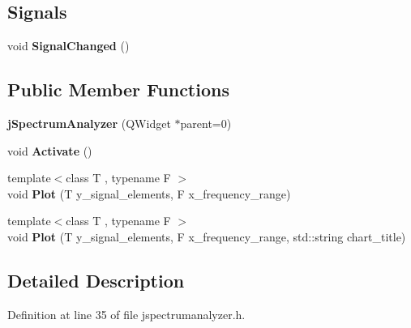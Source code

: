 \subsection*{Signals}
\begin{DoxyCompactItemize}
\item 
void {\bfseries Signal\+Changed} ()\hypertarget{classjaspl_1_1j_spectrum_analyzer_a9c5cf1221b35e6392fff8bf418edcedd}{}\label{classjaspl_1_1j_spectrum_analyzer_a9c5cf1221b35e6392fff8bf418edcedd}

\end{DoxyCompactItemize}
\subsection*{Public Member Functions}
\begin{DoxyCompactItemize}
\item 
{\bfseries j\+Spectrum\+Analyzer} (Q\+Widget $\ast$parent=0)\hypertarget{classjaspl_1_1j_spectrum_analyzer_a5101faac87201a91ea02e2afcbdf33db}{}\label{classjaspl_1_1j_spectrum_analyzer_a5101faac87201a91ea02e2afcbdf33db}

\item 
void {\bfseries Activate} ()\hypertarget{classjaspl_1_1j_spectrum_analyzer_a778e2eef7d689c8b9f4df3d0894af4a2}{}\label{classjaspl_1_1j_spectrum_analyzer_a778e2eef7d689c8b9f4df3d0894af4a2}

\item 
{\footnotesize template$<$class T , typename F $>$ }\\void {\bfseries Plot} (T y\+\_\+signal\+\_\+elements, F x\+\_\+frequency\+\_\+range)\hypertarget{classjaspl_1_1j_spectrum_analyzer_a1a9a7d7efd93e37a1bd76a7123cf4caf}{}\label{classjaspl_1_1j_spectrum_analyzer_a1a9a7d7efd93e37a1bd76a7123cf4caf}

\item 
{\footnotesize template$<$class T , typename F $>$ }\\void {\bfseries Plot} (T y\+\_\+signal\+\_\+elements, F x\+\_\+frequency\+\_\+range, std\+::string chart\+\_\+title)\hypertarget{classjaspl_1_1j_spectrum_analyzer_aff0590acca8571ced9b05a6d0f7932fb}{}\label{classjaspl_1_1j_spectrum_analyzer_aff0590acca8571ced9b05a6d0f7932fb}

\end{DoxyCompactItemize}


\subsection{Detailed Description}


Definition at line 35 of file jspectrumanalyzer.\+h.

